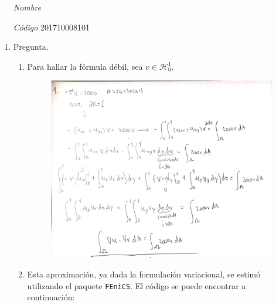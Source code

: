 \documentclass[fleqn]{article}
\begin{document}
\vspace{0.3cm}
\begin{itemize}[leftmargin=6.25cm, labelsep=0.5cm]

  \item[\textit{Nombre}]  %
  \item[\textit{Código}] 201710008101 %

\end{itemize}
\vspace{0.3cm}

\begin{enumerate}
  \item Pregunta.
        \begin{enumerate}
          \item Para hallar la fórmula débil, sea $v \in \mathcal{H}_{0}^{1}$.
                \begin{figure}[H]
                  \centering \includegraphics[scale=.5]{figs/1a}
                \end{figure}

          \item Esta aproximación, ya dada la formulación variacional, se estimó
                utilizando el paquete \texttt{FEniCS}. El código se puede
                encontrar a continuación:


\end{enumerate}
\end{enumerate}
\end{document}
